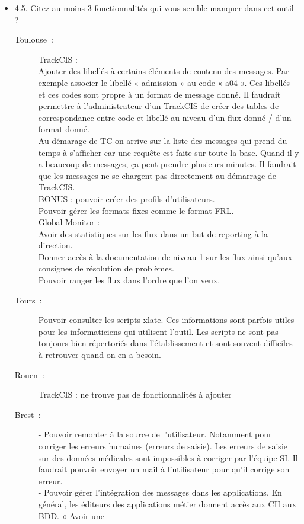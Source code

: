 \begin{itemize}
	  \item 4.5. Citez au moins 3 fonctionnalités qui vous semble manquer dans cet
	  outil ?
	  \begin{description}
	  	\item[Toulouse~:] TrackCIS :\\
		Ajouter des libellés à certains éléments de contenu des messages. Par exemple
		associer le libellé « admission » au code « a04 ». Ces libellés et ces codes
		sont propre à un format de message donné. Il faudrait permettre à
		l’administrateur d’un TrackCIS de créer des tables de correspondance entre code et
		libellé au niveau d’un flux donné / d’un format donné.\\
		Au démarage de TC on arrive sur la liste des messages qui prend du temps à
		s’afficher car une requête est faite sur toute la base. Quand il y a beaucoup
		de messages, ça peut prendre plusieurs minutes. Il faudrait que les messages
		ne se chargent pas directement au démarrage de TrackCIS.\\
		BONUS : pouvoir créer des profils d’utilisateurs.\\
		Pouvoir gérer les formats fixes comme le format FRL.\\
		Global Monitor :\\
		Avoir des statistiques sur les flux dans un but de reporting à la direction.\\
		Donner accès à la documentation de niveau 1 sur les flux ainsi qu’aux
		consignes de résolution de problèmes.\\
		Pouvoir ranger les flux dans l’ordre
		que l’on veux.
	  	\item[Tours~:] Pouvoir consulter les scripts xlate. Ces informations sont
	  	parfois utiles pour les informaticiens qui utilisent l’outil. Les scripts
	  	ne sont pas toujours bien répertoriés dans l’établissement et sont souvent
	  	difficiles à retrouver quand on en a besoin.
	  	\item[Rouen~:] TrackCIS : ne trouve pas de fonctionnalités à ajouter
	  	\item[Brest~:] - Pouvoir remonter à la source de l’utilisateur. Notamment
	  	pour corriger les erreurs humaines (erreurs de saisie). Les erreurs de
	  	saisie sur des données médicales sont impossibles à corriger par l’équipe
	  	SI. Il faudrait pouvoir envoyer un mail à l’utilisateur pour qu’il corrige
	  	son erreur.\\
		- Pouvoir gérer l’intégration des messages dans les applications. En général,
		les éditeurs des applications métier donnent accès aux CH aux BDD. « Avoir une

\end{description}
\end{itemize}
